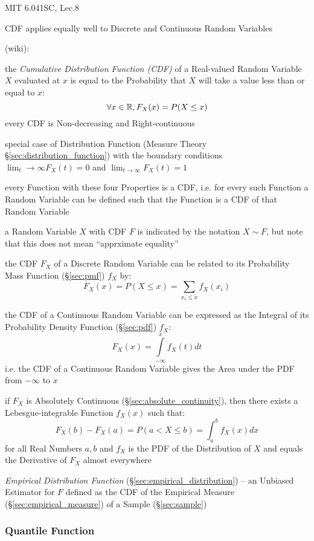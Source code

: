 MIT 6.041SC, Lec.8

CDF applies equally well to Discrete and Continuous Random Variables

(wiki):

the \emph{Cumulative Distribution Function (CDF)} of a Real-valued Random
Variable $X$ evaluated at $x$ is equal to the Probability that $X$ will take a
value less than or equal to $x$:
\[
  \forall x \in \mathbb{R}, F_X(x) = P(X \leq x)
\]
every CDF is Non-decreasing and Right-continuous

special case of Distribution Function (Measure Theory
\S\ref{sec:distribution_function}) with the boundary conditions
$\lim_t\rightarrow\infty F_X(t) = 0$ and $\lim_{t\rightarrow\infty}F_X(t) = 1$

every Function with these four Properties is a CDF, i.e. for every such Function
a Random Variable can be defined such that the Function is a CDF of that Random
Variable

a Random Variable $X$ with CDF $F$ is indicated by the notation $X \sim F$, but
note that this does not mean ``apprximate equality''

the CDF $F_X$ of a Discrete Random Variable can be related to its Probability
Mass Function (\S\ref{sec:pmf}) $f_X$ by:
\[
  F_X(x) = P(X \leq x) = \sum_{x_i \leq x} f_X(x_i)
\]

the CDF of a Continuous Random Variable can be expressed as the Integral of its
Probability Density Function (\S\ref{sec:pdf}) $f_X$:
\[
  F_X(x) = \int\limits_{-\infty}^x f_X(t) dt
\]
i.e. the CDF of a Continuous Random Variable gives the Area under the PDF from
$-\infty$ to $x$

if $F_X$ is Absolutely Continuous (\S\ref{sec:absolute_continuity}), then there
exists a Lebesgue-integrable Function $f_X(x)$ such that:
\[
  F_X(b) - F_X(a) = P(a < X \leq b) = \int_a^b f_X(x) dx
\]
for all Real Numbers $a, b$ and $f_X$ is the PDF of the Distribution of $X$
and equals the Derivative of $F_X$ almost everywhere

\fist \emph{Empirical Distribution Function}
(\S\ref{sec:empirical_distribution}) -- an Unbiased Estimator for $F$ defined as
the CDF of the Empirical Measure (\S\ref{sec:empirical_measure}) of a Sample
(\S\ref{sec:sample})



\subsubsection{Quantile Function}\label{sec:quantile_function}

